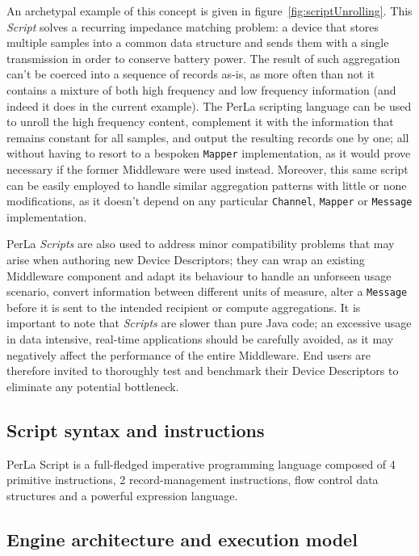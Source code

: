 An archetypal example of this concept is given in
figure~\ref{fig:scriptUnrolling}. This \textit{Script} solves a recurring
impedance matching problem: a device that stores multiple samples into a common
data structure and sends them with a single transmission in order to conserve
battery power. The result of such aggregation can't be coerced into a sequence
of records as-is, as more often than not it contains a mixture of both high
frequency and low frequency information (and indeed it does in the current
example). The PerLa scripting language can be used to unroll the high frequency
content, complement it with the information that remains constant for all
samples, and output the resulting records one by one; all without having to
resort to a bespoken \texttt{Mapper} implementation, as it would prove
necessary if the former Middleware were used instead. Moreover, this same
script can be easily employed to handle similar aggregation patterns with
little or none modifications, as it doesn't depend on any particular
\texttt{Channel}, \texttt{Mapper} or \texttt{Message} implementation.

PerLa \textit{Scripts} are also used to address minor compatibility problems
that may arise when authoring new Device Descriptors; they can wrap an existing
Middleware component and adapt its behaviour to handle an unforseen usage
scenario, convert information between different units of measure, alter a
\texttt{Message} before it is sent to the intended recipient or compute
aggregations. It is important to note that \textit{Scripts} are slower than
pure Java code; an excessive usage in data intensive, real-time applications
should be carefully avoided, as it may negatively affect the performance of the
entire Middleware. End users are therefore invited to thoroughly test and
benchmark their Device Descriptors to eliminate any potential bottleneck.


\subsection{Script syntax and instructions}

PerLa Script is a full-fledged imperative programming language composed of 4
primitive instructions, 2 record-management instructions, flow control data
structures and a powerful expression language.

\subsection{Engine architecture and execution model}

